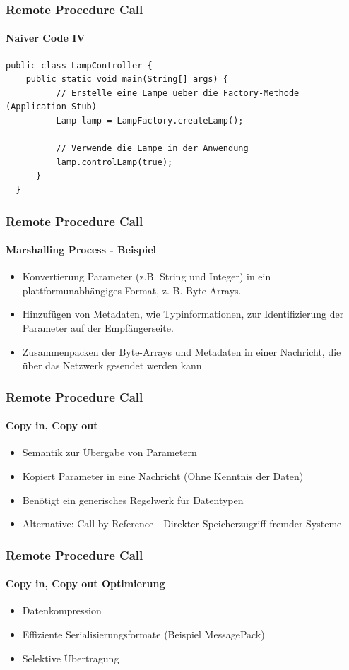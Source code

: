 \begin{frame}[fragile]
  \frametitle{Remote Procedure Call}
  \framesubtitle{Naiver Code IV}
  \begin{minipage}{\textwidth}
  \begin{lstlisting}[caption={Controller ruft Middleware},captionpos=b,label={lst:rpc-controller}]
  public class LampController {
    public static void main(String[] args) {
          // Erstelle eine Lampe ueber die Factory-Methode (Application-Stub)
          Lamp lamp = LampFactory.createLamp();

          // Verwende die Lampe in der Anwendung
          lamp.controlLamp(true);
      }
  }
  \end{lstlisting}
  \end{minipage}
\end{frame}

\begin{frame}
  \frametitle{Remote Procedure Call}
  \framesubtitle{Marshalling Process - Beispiel}
  \begin{itemize} 
  \item Konvertierung Parameter (z.B. String und Integer) in ein plattformunabhängiges Format, z. B. Byte-Arrays.
  \item Hinzufügen von Metadaten, wie Typinformationen, zur Identifizierung der Parameter auf der Empfängerseite.
  \item Zusammenpacken der Byte-Arrays und Metadaten in einer Nachricht, die über das Netzwerk gesendet werden kann
  \end{itemize} 
\end{frame}

\begin{frame}
  \frametitle{Remote Procedure Call}
  \framesubtitle{Copy in, Copy out}
  \begin{itemize} 
  \item Semantik zur Übergabe von Parametern 
  \item Kopiert Parameter in eine Nachricht (Ohne Kenntnis der Daten)
  \item Benötigt ein generisches Regelwerk für Datentypen
  \item Alternative: Call by Reference - Direkter Speicherzugriff fremder Systeme
  \end{itemize} 
\end{frame}

\begin{frame}
  \frametitle{Remote Procedure Call}
  \framesubtitle{Copy in, Copy out Optimierung}
  \begin{itemize} 
  \item Datenkompression
  \item Effiziente Serialisierungsformate (Beispiel MessagePack)
  \item Selektive Übertragung
  \end{itemize} 
\end{frame}


